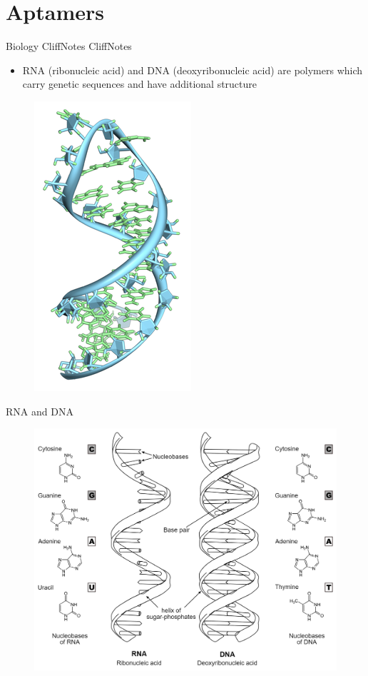 \documentclass{beamer}
\begin{document}
\section{Aptamers}
\begin{frame}{Biology CliffNotes CliffNotes}
  \begin{itemize}
    \item RNA (ribonucleic acid) and DNA (deoxyribonucleic acid) are polymers which carry genetic sequences and have additional structure
  \end{itemize}
  \begin{figure}
    \begin{center}
      \includegraphics[width=.3\textwidth]{rna.png}
    \end{center}
  \end{figure}
\end{frame}

\begin{frame}{RNA and DNA}
  \begin{figure}
    \begin{center}
      \includegraphics[width=1\textwidth]{rnadna.png}
    \end{center}
  \end{figure}
\end{frame}
\end{document}
